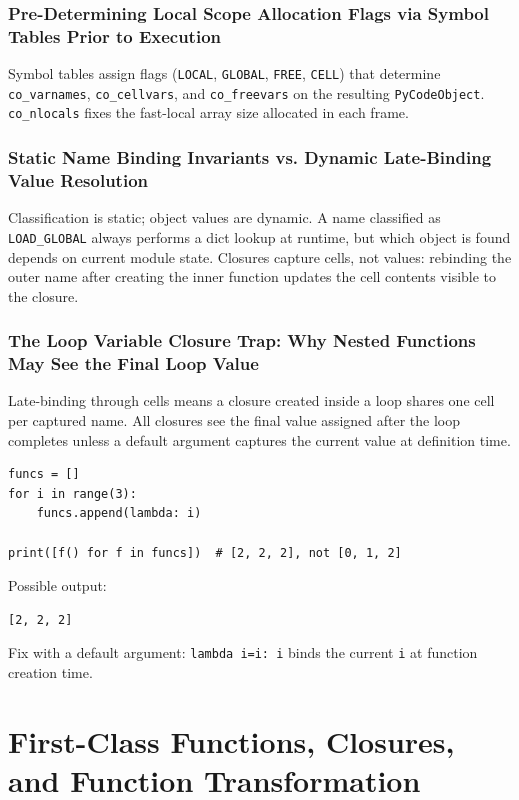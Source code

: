 \documentclass[a4paper,twoside]{report}
\begin{document}
\subsubsection{Pre-Determining Local Scope Allocation Flags via Symbol Tables Prior to Execution}

Symbol tables assign flags (\texttt{LOCAL}, \texttt{GLOBAL}, \texttt{FREE}, \texttt{CELL}) that determine \texttt{co\_varnames}, \texttt{co\_cellvars}, and \texttt{co\_freevars} on the resulting \texttt{PyCodeObject}. \texttt{co\_nlocals} fixes the fast-local array size allocated in each frame.

\subsubsection{Static Name Binding Invariants vs. Dynamic Late-Binding Value Resolution}

Classification is static; object values are dynamic. A name classified as \texttt{LOAD\_GLOBAL} always performs a dict lookup at runtime, but which object is found depends on current module state. Closures capture cells, not values: rebinding the outer name after creating the inner function updates the cell contents visible to the closure.

\subsubsection{The Loop Variable Closure Trap: Why Nested Functions May See the Final Loop Value}

Late-binding through cells means a closure created inside a loop shares one cell per captured name. All closures see the final value assigned after the loop completes unless a default argument captures the current value at definition time.

\begin{verbatim}
funcs = []
for i in range(3):
    funcs.append(lambda: i)

print([f() for f in funcs])  # [2, 2, 2], not [0, 1, 2]
\end{verbatim}

Possible output:

\begin{verbatim}
[2, 2, 2]
\end{verbatim}

Fix with a default argument: \texttt{lambda i=i: i} binds the current \texttt{i} at function creation time.


\section{First-Class Functions, Closures, and Function Transformation}
\end{document}
